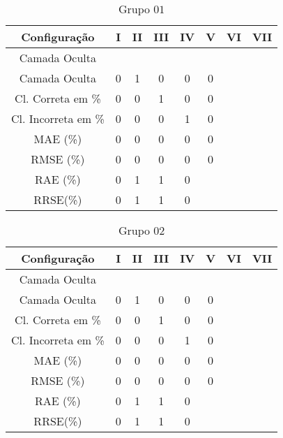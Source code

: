 \documentclass[journal, a4paper]{IEEEtran}
\begin{document}
\begin{table}[H]
	\begin{center}
				\caption{Grupo $01$}
				\label{grupo01}
				\begin{tabular}{|c|c|c|c|c|c|c|c|}\hline	
					\textbf{Configuração} &\textbf{I}&\textbf{II}&\textbf{III}&\textbf{IV}&\textbf{V}&\textbf{VI}&\textbf{VII} \\ \hline 
					{Camada Oculta} &  &  &  &  & & &  \\ \hline
					{Camada Oculta} &0 & 1 & 0 & 0 & 0 & &\\ \hline
					{Cl. Correta em \%} & 0 & 0 & 1 & 0 & 0 & & \\ \hline
					{Cl. Incorreta em \%} & 0 & 0 & 0 & 1 & 0 & &\\ \hline
					{MAE (\%)} & 0 & 0 & 0 & 0 & 0 & &  \\ \hline
					{RMSE (\%)} & 0 & 0 & 0 & 0 & 0 & & \\ \hline
					{RAE (\%)} & 0 & 1 & 1 & 0 & & & \\ \hline
					{RRSE(\%)} & 0 & 1 & 1 & 0 & & & \\ \hline
				\end{tabular}  
	\end{center}
\end{table}

\begin{table}[H]
	\begin{center}
		\caption{Grupo $02$}
		\label{grupo02}
		\begin{tabular}{|c|c|c|c|c|c|c|c|}\hline	
			\textbf{Configuração} &\textbf{I}&\textbf{II}&\textbf{III}&\textbf{IV}&\textbf{V}&\textbf{VI}&\textbf{VII} \\ \hline 
			{Camada Oculta} &  &  &  &  & & &  \\ \hline
			{Camada Oculta} &0 & 1 & 0 & 0 & 0 & &\\ \hline
			{Cl. Correta em \%} & 0 & 0 & 1 & 0 & 0 & & \\ \hline
			{Cl. Incorreta em \%} & 0 & 0 & 0 & 1 & 0 & &\\ \hline
			{MAE (\%)} & 0 & 0 & 0 & 0 & 0 & &  \\ \hline
			{RMSE (\%)} & 0 & 0 & 0 & 0 & 0 & & \\ \hline
			{RAE (\%)} & 0 & 1 & 1 & 0 & & & \\ \hline
			{RRSE(\%)} & 0 & 1 & 1 & 0 & & & \\ \hline
		\end{tabular}  
	\end{center}
\end{table}
\end{document}
